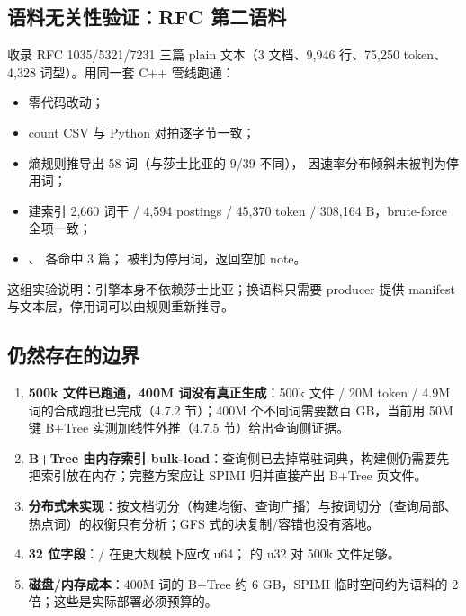 \subsection{语料无关性验证：RFC 第二语料}

 收录 RFC 1035/5321/7231 三篇 plain 文本（3 文档、9,946 行、75,250 token、4,328 词型）。用同一套 C++ 管线跑通：

\begin{itemize}
  \item {} 零代码改动；
  \item count CSV 与 Python 对拍逐字节一致；
  \item 熵规则推导出 58 词（与莎士比亚的 9/39 不同）， 因速率分布倾斜未被判为停用词；
  \item 建索引 2,660 词干 / 4,594 postings / 45,370 token / 308,164 B，brute-force 全项一致；
  \item {}、 各命中 3 篇； 被判为停用词，返回空加 note。
\end{itemize}

这组实验说明：引擎本身不依赖莎士比亚；换语料只需要 producer 提供 manifest 与文本层，停用词可以由规则重新推导。

\subsection{仍然存在的边界}

\begin{enumerate}
  \item \textbf{500k 文件已跑通，400M 词没有真正生成}：500k 文件 / 20M token / 4.9M 词的合成跑批已完成（4.7.2 节）；400M 个不同词需要数百 GB，当前用 50M 键 B+Tree 实测加线性外推（4.7.5 节）给出查询侧证据。
  \item \textbf{B+Tree 由内存索引 bulk-load}：查询侧已去掉常驻词典，构建侧仍需要先把索引放在内存；完整方案应让 SPIMI 归并直接产出 B+Tree 页文件。
  \item \textbf{分布式未实现}：按文档切分（构建均衡、查询广播）与按词切分（查询局部、热点词）的权衡只有分析；GFS 式的块复制/容错也没有落地。
  \item \textbf{32 位字段}：/ 在更大规模下应改 u64； 的 u32 对 500k 文件足够。
  \item \textbf{磁盘/内存成本}：400M 词的 B+Tree 约 6 GB，SPIMI 临时空间约为语料的 2 倍；这些是实际部署必须预算的。
\end{enumerate}

